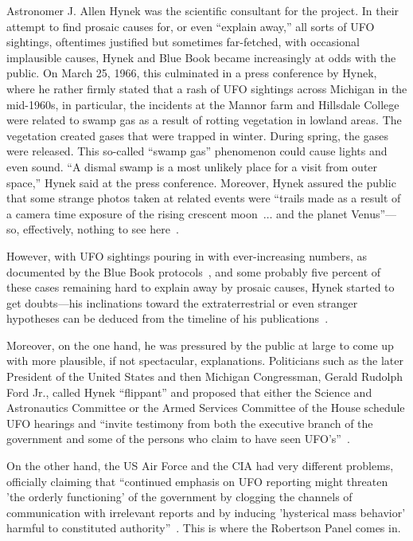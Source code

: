Astronomer J. Allen Hynek was the scientific consultant for the project.
In their attempt to find prosaic causes for, or even ``explain away,'' all sorts of UFO sightings,
oftentimes justified but sometimes far-fetched, with occasional implausible causes,
Hynek and Blue Book became increasingly at odds with the public. On March 25, 1966,
this culminated in a press conference by Hynek, where he rather firmly stated that a rash of UFO sightings across Michigan in the mid-1960s,
in particular, the incidents at the Mannor farm and Hillsdale College were related to swamp gas as a result of rotting vegetation in
lowland areas. The vegetation created gases that were trapped in winter. During spring, the gases were released.
This so-called ``swamp gas'' phenomenon could cause lights and even sound.
``A dismal swamp is a most unlikely place for a visit from outer space,'' Hynek said at the press conference.
Moreover, Hynek assured the public that some strange photos taken at related events were
``trails made as a result of a camera time exposure of the rising crescent moon~$\ldots$ and the planet Venus''---so, effectively, nothing to see here~\cite{Zielin-swampgas}.

However, with UFO sightings pouring in with ever-increasing numbers, as documented by the Blue Book protocols~\cite{bluebook-directory-listing}, and some probably five percent of these cases remaining hard to explain away by prosaic causes, Hynek started to get doubts---his inclinations toward the extraterrestrial or even stranger hypotheses can be deduced from the timeline of his publications~\cite{Hynek:53,Hynek_1969,Hynek1972,Hynek1975Dec,Hynek1977Jan}.


Moreover, on the one hand, he was pressured by the public at large to come up with more plausible, if not spectacular, explanations. Politicians such as the later President of the United States and then Michigan Congressman, Gerald Rudolph Ford Jr., called Hynek ``flippant'' and proposed that either the Science and Astronautics Committee or the Armed Services Committee of the House schedule UFO hearings and ``invite testimony from both the executive branch of the government and some of the persons who claim to have seen UFO's''~\cite{Logan2016Apr}.

On the other hand, the US Air Force and the CIA had very different problems, officially claiming that ``continued emphasis on UFO reporting might threaten 'the orderly functioning' of the government by clogging the channels of communication with irrelevant reports and by inducing 'hysterical mass behavior' harmful to constituted authority''~\cite{Haines-CIA-UFO}. This is where the Robertson Panel comes in.

